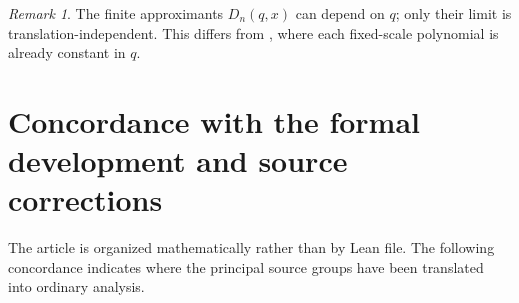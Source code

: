 \documentclass[11pt]{article}
\numberwithin{equation}{section}
\theoremstyle{definition}
\theoremstyle{remark}
\newtheorem{remark}[theorem]{Remark}
\begin{document}
\begin{remark}
The finite approximants $D_n(q,x)$ can depend on $q$; only their limit is
translation-independent.  This differs from
, where each fixed-scale polynomial is already
constant in $q$.
\end{remark}

\section{Concordance with the formal development and source corrections}
\label{app:concordance}

The article is organized mathematically rather than by Lean file.  The
following concordance indicates where the principal source groups have been
translated into ordinary analysis.
\end{document}
